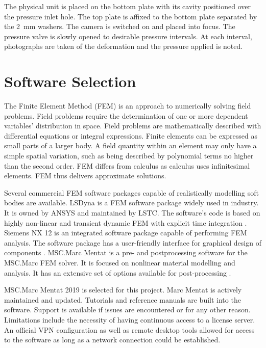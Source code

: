 The physical unit is placed on the bottom plate with its cavity positioned over the pressure inlet hole. The top plate is affixed to the bottom plate separated by the \SI{2}{mm} washers. The camera is switched on and placed into focus. The pressure valve is slowly opened to desirable pressure intervals. At each interval, photographs are taken of the deformation and the pressure applied is noted.

\section{Software Selection}

The Finite Element Method (FEM) is an approach to numerically solving field problems. Field problems require the determination of one or more dependent variables' distribution in space. Field problems are mathematically described with differential equations or integral expressions. Finite elements can be expressed as small parts of a larger body. A field quantity within an element may only have a simple spatial variation, such as being described by polynomial terms no higher than the second order. FEM differs from calculus as calculus uses infinitesimal elements. FEM thus delivers approximate solutions. \citep{Cook2002}

Several commercial FEM software packages capable of realistically modelling soft bodies are available. LSDyna is a FEM software package widely used in industry. It is owned by ANSYS and maintained by LSTC. The software's code is based on highly non-linear and transient dynamic FEM with explicit time integration \citep{LSDyna}. Siemens NX 12 is an integrated software package capable of performing FEM analysis. The software package has a user-friendly interface for graphical design of components \citep{NX12}. MSC.Marc Mentat is a pre- and postprocessing software for the MSC.Marc FEM solver. It is focused on nonlinear material modelling and analysis. It has an extensive set of options available for post-processing \citep{MSC}.

MSC.Marc Mentat 2019 is selected for this project. Marc Mentat is actively maintained and updated. Tutorials and reference manuals are built into the software. Support is available if issues are encountered or for any other reason. Limitations include the necessity of having continuous access to a license server. An official VPN configuration as well as remote desktop tools allowed for access to the software as long as a network connection could be established.

